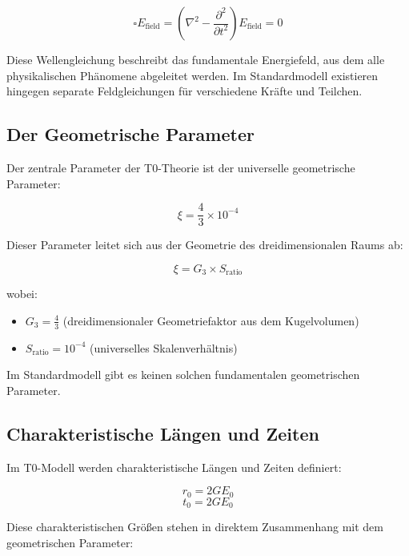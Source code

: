 \documentclass[12pt,a4paper]{article}
\newcommand{\efield}{E_{\text{field}}}
\theoremstyle{definition}
\begin{document}
	\begin{equation}
		\boxed{\square \efield = \left(\nabla^2 - \frac{\partial^2}{\partial t^2}\right) \efield = 0}
	\end{equation}
	
	Diese Wellengleichung beschreibt das fundamentale Energiefeld, aus dem alle physikalischen Phänomene abgeleitet werden. Im Standardmodell existieren hingegen separate Feldgleichungen für verschiedene Kräfte und Teilchen.
	
	\subsection{Der Geometrische Parameter}
	
	Der zentrale Parameter der T0-Theorie ist der universelle geometrische Parameter:
	
	\begin{equation}
		\boxed{\xi = \frac{4}{3} \times 10^{-4}}
	\end{equation}
	
	Dieser Parameter leitet sich aus der Geometrie des dreidimensionalen Raums ab:
	
	\begin{equation}
		\xi = G_3 \times S_{\text{ratio}}
	\end{equation}
	
	wobei:
	\begin{itemize}
		\item $G_3 = \frac{4}{3}$ (dreidimensionaler Geometriefaktor aus dem Kugelvolumen)
		\item $S_{\text{ratio}} = 10^{-4}$ (universelles Skalenverhältnis)
	\end{itemize}
	
	Im Standardmodell gibt es keinen solchen fundamentalen geometrischen Parameter.
	
	\subsection{Charakteristische Längen und Zeiten}
	
	Im T0-Modell werden charakteristische Längen und Zeiten definiert:
	
	\begin{equation}
		\boxed{r_0 = 2GE_0}
	\end{equation}
	\begin{equation}
		\boxed{t_0 = 2GE_0}
	\end{equation}
	
	Diese charakteristischen Größen stehen in direktem Zusammenhang mit dem geometrischen Parameter:
	
\end{document}
